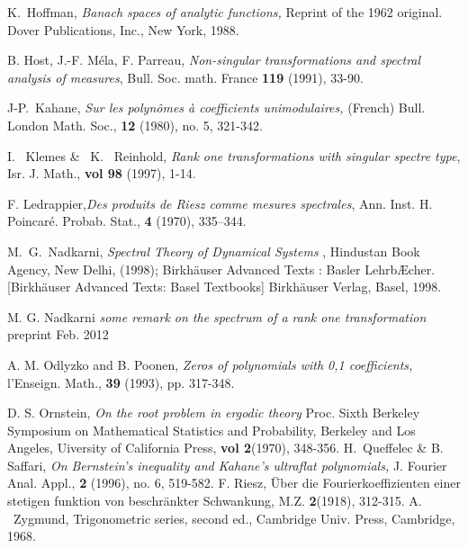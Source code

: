 \documentclass{amsart}
\theoremstyle{definition}
\theoremstyle{remark}
\numberwithin{equation}{section}
\newcommand{\1}{\mathbb{1}}
\begin{document}
\begin{thebibliography}{99-}
 K.~Hoffman, {\em Banach spaces of analytic functions,} Reprint of the 1962 original. Dover Publications, Inc., New York, 1988.

 B. Host, J.-F. M\'ela, F. Parreau, {\em Non-singular transformations and spectral analysis of measures}, Bull. Soc. math. France {\textbf{119}} (1991), 33-90.

J-P.~Kahane, \emph{Sur les polyn\^omes \`a coefficients unimodulaires,} (French) Bull. London Math. Soc., {\textbf{12}} (1980),
no. 5, 321-342.

I. ~Klemes \& ~K. ~Reinhold, {\em  Rank one transformations with singular spectre type}, Isr. J. Math.,  \textbf{vol 98} (1997), 1-14.

F. Ledrappier,{\em Des produits de Riesz comme mesures spectrales}, Ann. Inst. H. Poincar\'e. Probab. Stat., {\textbf{4}} (1970), 335–344.

M.~G.~Nadkarni, {\em Spectral Theory of Dynamical Systems },
Hindustan Book Agency, New Delhi, (1998); Birkh\"{a}user Advanced
Texts : Basler Lehrb{\AE}cher. [Birkh\"auser Advanced Texts: Basel
Textbooks] Birkh\"auser Verlag, Basel, 1998.

M. G. Nadkarni {\em some remark on the spectrum of a rank one transformation} {preprint Feb. 2012}

A. M. Odlyzko and B. Poonen, {\em Zeros of polynomials with 0,1 coefficients,}  l'Enseign. Math., {\textbf{39}} (1993), pp. 317-348.

D. S. Ornstein, {\em On the root problem in ergodic  theory} Proc. Sixth Berkeley Symposium
on Mathematical Statistics and Probability, Berkeley and Los Angeles, Uiversity of California Press, {\textbf{vol 2}}{(1970)}, 348-356.
H.~Queffelec \& B. Saffari, {\em On Bernstein's inequality and Kahane's ultraflat polynomials,} J. Fourier Anal. Appl., {\textbf{2}} (1996), no. 6, 519-582.
F. Riesz, {\"{U}ber die Fourierkoeffizienten einer stetigen funktion von beschr\"{a}nkter Schwankung, M.Z.} {\textbf{2}}(1918), 312-315.
 A. ~Zygmund, {Trigonometric series,} second ed.,
Cambridge Univ. Press, Cambridge, 1968.
\end{thebibliography}
\end{document}
